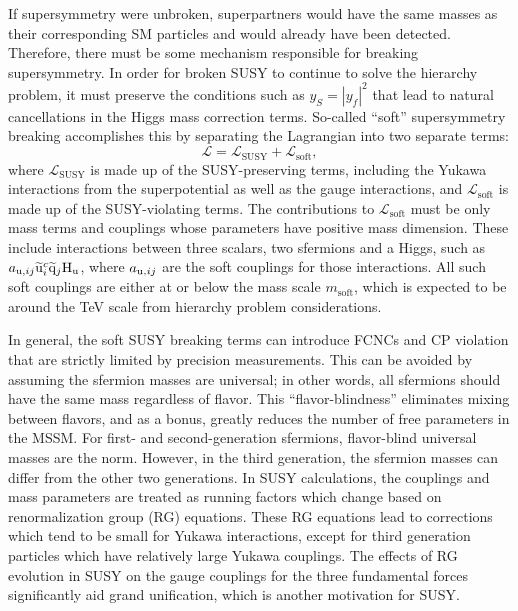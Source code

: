If supersymmetry were unbroken, superpartners would have the same masses as their corresponding SM particles and would already have been detected. Therefore, there must be some mechanism responsible for breaking supersymmetry. In order for broken SUSY to continue to solve the hierarchy problem, it must preserve the conditions such as $y_{S} = |y_{f}|^2$ that lead to natural cancellations in the Higgs mass correction terms. So-called ``soft'' supersymmetry breaking accomplishes this by separating the Lagrangian into two separate terms:
\begin{equation}
\mathcal{L} = \mathcal{L}_{\text{SUSY}} + \mathcal{L}_{\text{soft}},
\end{equation}
where $\mathcal{L}_{\text{SUSY}}$ is made up of the SUSY-preserving terms, including the Yukawa interactions from the superpotential as well as the gauge interactions, and $\mathcal{L}_{\text{soft}}$ is made up of the SUSY-violating terms. The contributions to $\mathcal{L}_{\text{soft}}$ must be only mass terms and couplings whose parameters have positive mass dimension. These include interactions between three scalars, two sfermions and a Higgs, such as $a_{\mathrm{u},ij} \widetilde{\mathrm{u}}_{i}^{c} \widetilde{\mathrm{q}}_{j} \mathrm{H}_\mathrm{u}$, where $a_{\mathrm{u},ij}$ are the soft couplings for those interactions. All such soft couplings are either at or below the mass scale $m_{\text{soft}}$, which is expected to be around the TeV scale from hierarchy problem considerations.

In general, the soft SUSY breaking terms can introduce FCNCs and CP violation that are strictly limited by precision measurements. This can be avoided by assuming the sfermion masses are universal; in other words, all sfermions should have the same mass regardless of flavor. This ``flavor-blindness'' eliminates mixing between flavors, and as a bonus, greatly reduces the number of free parameters in the MSSM. For first- and second-generation sfermions, flavor-blind universal masses are the norm. However, in the third generation, the sfermion masses can differ from the other two generations. In SUSY calculations, the couplings and mass parameters are treated as running factors which change based on renormalization group (RG) equations. These RG equations lead to corrections which tend to be small for Yukawa interactions, except for third generation particles which have relatively large Yukawa couplings. The effects of RG evolution in SUSY on the gauge couplings for the three fundamental forces significantly aid grand unification, which is another motivation for SUSY.

